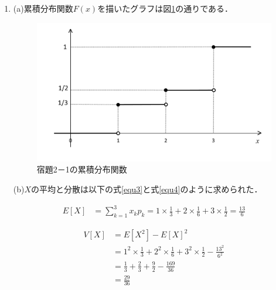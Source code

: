 \documentclass[a4paper,10pt]{jarticle}
\begin{document}
\begin{enumerate}
	\setlength{\itemsep}{-2mm}
	 \item (a)累積分布関数$F(x)$を描いたグラフは図\ref*{apara}の通りである．
	 
	 \vspace{3mm}

	 \begin{figure}[ht]
		\begin{center}
		 \includegraphics[scale=1.0]{zu4.png}
		 \caption{宿題2－1の累積分布関数}
		 \label{apara}
		\end{center}
		\end{figure}

				(b)$X$の平均と分散は以下の式\ref*{equ3}と式\ref*{equ4}のように求められた．

	\begin{equation}
		\label{equ3}
		\begin{split}
			E[X] &= \sum_{k = 1}^{3}x_{k} p_{k} = 1 \times \frac{1}{3} + 2 \times \frac{1}{6} + 3 \times \frac{1}{2} = \frac{13}{6}
		\end{split}
	\end{equation}

	\begin{equation}
		\label{equ4}
		\begin{split}
			V[X] &= E[X^2]-{E[X]}^2 \\
					 &= 1^2 \times \frac{1}{3} +2^2 \times \frac{1}{6} +3^2 \times \frac{1}{2} - \frac{13^2}{6^2} \\
					 &= \frac{1}{3}+\frac{2}{3}+\frac{9}{2}-\frac{169}{36} \\
					 &= \frac{29}{36}
		\end{split}
	\end{equation}


\end{enumerate}
\end{document}
